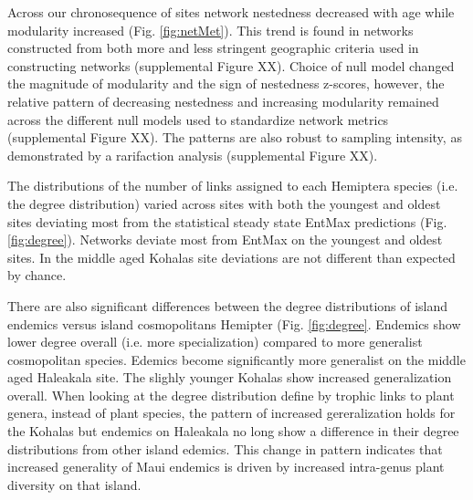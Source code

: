 \documentclass[12pt]{article}
\begin{document}
Across our chronosequence of sites network nestedness decreased with
age while modularity increased (Fig. \ref{fig:netMet}). This trend is
found in networks constructed from both more and less stringent
geographic criteria used in constructing networks (supplemental Figure
XX).  Choice of null model changed the magnitude of modularity and the
sign of nestedness z-scores, however, the relative pattern of
decreasing nestedness and increasing modularity remained across the
different null models used to standardize network metrics
(supplemental Figure XX).  The patterns are also robust to sampling
intensity, as demonstrated by a rarifaction analysis (supplemental
Figure XX).

The distributions of the number of links assigned to each Hemiptera
species (i.e. the degree distribution) varied across sites with both
the youngest and oldest sites deviating most from the statistical
steady state EntMax predictions (Fig. \ref{fig:degree}). Networks
deviate most from EntMax on the youngest and oldest sites. In the
middle aged Kohalas site deviations are not different than expected by
chance.

There are also significant differences between the degree
distributions of island endemics versus island cosmopolitans Hemipter
(Fig. \ref{fig:degree}. Endemics show lower degree overall (i.e. more
specialization) compared to more generalist cosmopolitan
species. Edemics become significantly more generalist on the middle
aged Haleakala site. The slighly younger Kohalas show increased
generalization overall. When looking at the degree distribution define
by trophic links to plant genera, instead of plant species, the
pattern of increased gereralization holds for the Kohalas but endemics
on Haleakala no long show a difference in their degree distributions
from other island edemics. This change in pattern indicates that
increased generality of Maui endemics is driven by increased
intra-genus plant diversity on that island.
\end{document}
